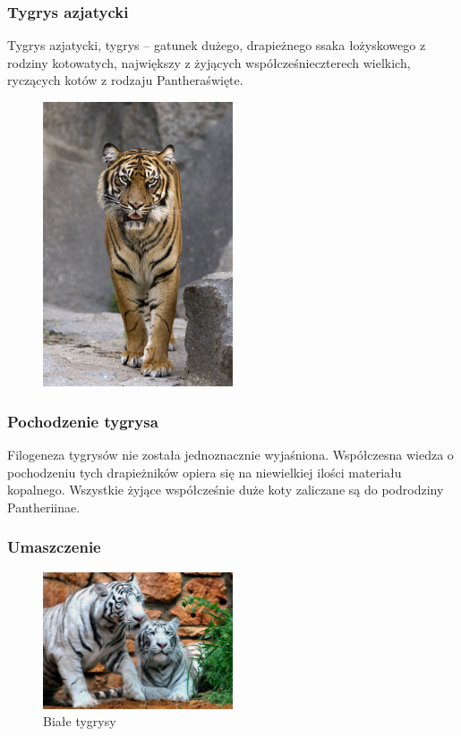 \documentclass{beamer}
\begin{document}
\begin{frame}
\frametitle{Tygrys azjatycki}
 Tygrys azjatycki, tygrys  – gatunek dużego, drapieżnego ssaka łożyskowego z rodziny kotowatych, największy z żyjących współcześnieczterech wielkich, ryczących kotów z rodzaju Pantheraświęte.
\end{frame}

\begin{frame}
\begin{figure}

\centering
\includegraphics[width=0.5\textwidth]{tigris.jpg}
\end{figure}
\end{frame}
 \begin{frame}
 \frametitle{Pochodzenie tygrysa}
 Filogeneza tygrysów nie została jednoznacznie wyjaśniona. Współczesna wiedza o pochodzeniu tych drapieżników opiera się na niewielkiej ilości materiału kopalnego. Wszystkie żyjące współcześnie duże koty zaliczane są do podrodziny Pantheriinae. 
 \end{frame}
\begin{frame}
 \frametitle{Umaszczenie}
 \begin{figure}
\caption{Białe tygrysy}
\centering
\includegraphics[width=0.5\textwidth]{White_Tigers.jpg}
\end{figure}
\end{frame}
\end{document}
